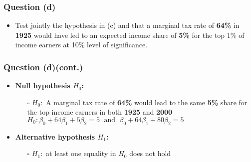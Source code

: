 \documentclass[11pt, xcolor=x11names,compress]{beamer}
\begin{document}
\begin{frame}
\frametitle{Question (d)}
\begin{itemize}
    \item Test jointly the hypothesis in (c) and that a marginal tax rate of \textbf{64\%} in \textbf{1925} would have led to an expected income share of \textbf{5\%} for the top 1\% of income earners at 10\% level of significance.\\
\end{itemize}
\end{frame}

\begin{frame}
\frametitle{Question (d)(cont.)}
\begin{itemize}
    \item \textbf{Null hypothesis $H_0$:} 
    \begin{itemize}
        \item[$\square$] $H_0:$ A marginal tax rate of \textbf{64\%} would lead to the same \textbf{5\%} share for the top income earners in both \textbf{1925} and \textbf{2000}\\
        \vspace{2mm}
        $H_0: \beta_0 + 64 \beta_1 + 5 \beta_2 = 5 \; \text{ and } \; \beta_0 + 64 \beta_1 + 80 \beta_2 = 5$\\
        \vspace{2mm}
    \end{itemize}
    \vspace{3mm}
    \item \textbf{Alternative hypothesis $H_1$:}
    \begin{itemize}
        \item[$\square$] $H_1:$ at least one equality in $H_0$  does not hold\\
    \end{itemize}
\end{itemize}
\end{frame}
\end{document}
